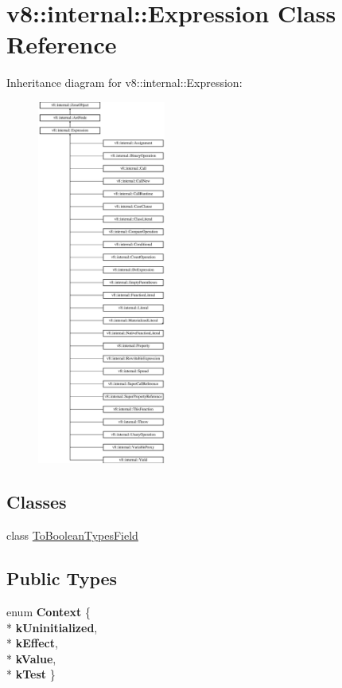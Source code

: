 \hypertarget{classv8_1_1internal_1_1_expression}{}\section{v8\+:\+:internal\+:\+:Expression Class Reference}
\label{classv8_1_1internal_1_1_expression}
Inheritance diagram for v8\+:\+:internal\+:\+:Expression\+:\begin{figure}[H]
\begin{center}
\leavevmode
\includegraphics[height=12.000000cm]{classv8_1_1internal_1_1_expression}
\end{center}
\end{figure}
\subsection*{Classes}
\begin{DoxyCompactItemize}
\item 
class \hyperlink{classv8_1_1internal_1_1_expression_1_1_to_boolean_types_field}{To\+Boolean\+Types\+Field}
\end{DoxyCompactItemize}
\subsection*{Public Types}
\begin{DoxyCompactItemize}
\item 
enum {\bfseries Context} \{ \\*
{\bfseries k\+Uninitialized}, 
\\*
{\bfseries k\+Effect}, 
\\*
{\bfseries k\+Value}, 
\\*
{\bfseries k\+Test}
 \}\hypertarget{classv8_1_1internal_1_1_expression_a04f7abd80505ef4b9e813324d2fb37a9}{}\label{classv8_1_1internal_1_1_expression_a04f7abd80505ef4b9e813324d2fb37a9}

\end{DoxyCompactItemize}
